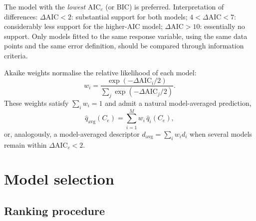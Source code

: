 \documentclass[journal=aamick,manuscript=article]{achemso}
\begin{document}
The model with the \emph{lowest} AIC$_c$ (or BIC) is preferred.
Interpretation of differences:
$\Delta\mathrm{AIC} < 2$: substantial support for both models;
$4 < \Delta\mathrm{AIC} < 7$: considerably less support for the
higher-AIC model;
$\Delta\mathrm{AIC} > 10$: essentially no support.
Only models fitted to the same response variable, using the same data
points and the same error definition, should be compared through
information criteria.

Akaike weights normalise the relative likelihood of each model:
\begin{equation}
	w_i = \frac{\exp(-\Delta\mathrm{AIC}_i/2)}
	{\sum_{j}\exp(-\Delta\mathrm{AIC}_j/2)}.
	\label{eq:si_Akaike_weight}
\end{equation}
These weights satisfy $\sum_i w_i = 1$ and admit a natural
model-averaged prediction,
\begin{equation}
	\hat{q}_{\mathrm{avg}}(C_e)
	=
	\sum_{i=1}^{M} w_i\, \hat{q}_i(C_e),
	\label{eq:si_model_average}
\end{equation}
or, analogously, a model-averaged descriptor
$d_{\mathrm{avg}} = \sum_i w_i d_i$ when several models remain within
$\Delta\mathrm{AIC}_c < 2$.


\section{Model selection}
\label{sec:si_model_selection}

\subsection{Ranking procedure}
\label{sec:si_ranking}
\end{document}
